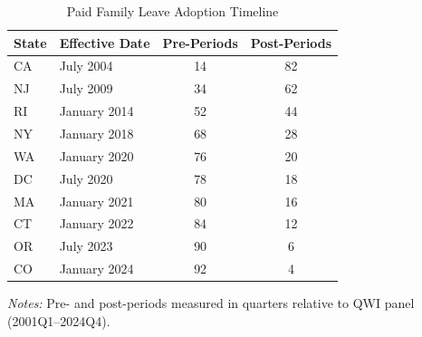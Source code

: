 \begin{table}[htbp]
\begin{threeparttable}
\centering
\caption{Paid Family Leave Adoption Timeline}
\label{tab:pfl_timeline}
\begin{tabular}{llcc}
\toprule
State & Effective Date & Pre-Periods & Post-Periods \\
\midrule
CA & July 2004 & 14 & 82 \\
NJ & July 2009 & 34 & 62 \\
RI & January 2014 & 52 & 44 \\
NY & January 2018 & 68 & 28 \\
WA & January 2020 & 76 & 20 \\
DC & July 2020 & 78 & 18 \\
MA & January 2021 & 80 & 16 \\
CT & January 2022 & 84 & 12 \\
OR & July 2023 & 90 & 6 \\
CO & January 2024 & 92 & 4 \\
\bottomrule
\end{tabular}
\begin{tablenotes}
\item \textit{Notes:} Pre- and post-periods measured in quarters relative to QWI panel (2001Q1--2024Q4).
\end{tablenotes}
\end{threeparttable}
\end{table}
